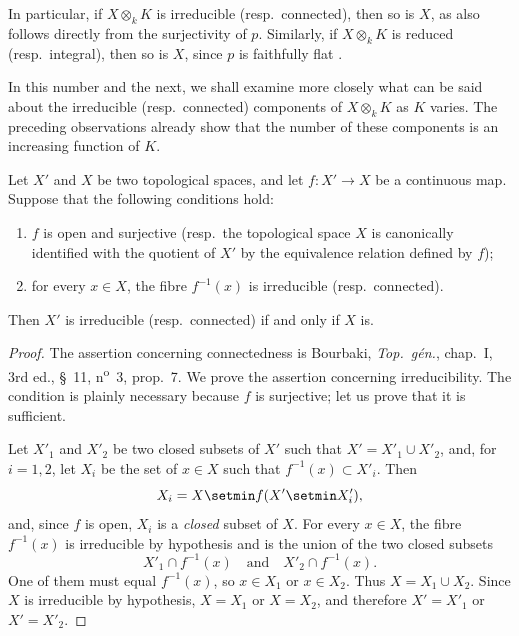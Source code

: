 \begin{env}[4.4.1]
In particular, if $X\otimes_k K$ is irreducible (resp.\ connected), then
so is $X$, as also follows directly from the surjectivity of $p$.
Similarly, if $X\otimes_k K$ is reduced (resp.\ integral), then so is
$X$, since $p$ is faithfully flat .

In this number and the next, we shall examine more closely what can be
said about the irreducible (resp.\ connected) components of
$X\otimes_k K$ as $K$ varies.
The preceding observations already show that the number of these
components is an increasing function of $K$.
\end{env}

\begin{lemma}[4.4.2]
\label{IV.4.4.2}
Let $X'$ and $X$ be two topological spaces, and let
$f:X'\to X$ be a continuous map.
Suppose that the following conditions hold:
\begin{enumerate}
\item[\rm(i)]
\label{IV.4.4.2.i}
$f$ is open and surjective \textup{(resp.\ }the topological space $X$ is
canonically identified with the quotient of $X'$ by the equivalence
relation defined by $f$\textup{)};


\item[\rm(ii)]
\label{IV.4.4.2.ii}
for every $x\in X$, the fibre $f^{-1}(x)$ is irreducible
\textup{(resp.\ }connected\textup{)}.
\end{enumerate}
Then $X'$ is irreducible \textup{(resp.\ }connected\textup{)} if and only if $X$ is.
\end{lemma}

\begin{proof}
The assertion concerning connectedness is Bourbaki,
\emph{Top.\ g\'en.}, chap.~I, 3rd ed., \S~11, n\textsuperscript{o}~3, prop.~7.
We prove the assertion concerning irreducibility.
The condition is plainly necessary because $f$ is surjective; let us
prove that it is sufficient.

Let $X'_1$ and $X'_2$ be two closed subsets of $X'$ such that
$X'=X'_1\cup X'_2$, and, for $i=1,2$, let $X_i$ be the set of
$x\in X$ such that $f^{-1}(x)\subset X'_i$.
Then
\[
X_i=X\setmin f(X'\setmin X'_i),
\]
and, since $f$ is open, $X_i$ is a \emph{closed} subset of $X$.
For every $x\in X$, the fibre $f^{-1}(x)$ is irreducible by hypothesis
and is the union of the two closed subsets
\[
X'_1\cap f^{-1}(x)
\quad\text{and}\quad
X'_2\cap f^{-1}(x).
\]
One of them must equal $f^{-1}(x)$, so $x\in X_1$ or $x\in X_2$.
Thus $X=X_1\cup X_2$.
Since $X$ is irreducible by hypothesis, $X=X_1$ or $X=X_2$, and therefore
$X'=X'_1$ or $X'=X'_2$.
\end{proof}

